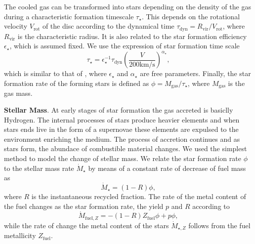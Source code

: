 \documentclass[usenatbib]{mn2e}
\begin{document}
The cooled gas can be  transformed into stars depending on the density of the gas during a characteristic formation timescale $\tau_{\star}$. This depends on the rotational velocity 
$V_{\text{rot}}$ of the disc according to the dynamical time $\tau_{\text{dyn}}=R_{\text{vir}}/V_{\text{rot}}$, where $R_{\text{vir}}$ is the characteristic radius. It is also related to
the star formation efficiency $\epsilon_{\star}$, which is assumed fixed. We use the expression of star formation time scale
\begin{equation}
 \tau_{\star} = \epsilon^{-1}_{\star}\tau_{\text{dyn}}\left( \frac{V}{200\text{km/s}}\right)^{\alpha_\star},
\end{equation}
which is similar to that of \cite{2005MNRAS.356.1191B}, where  $\epsilon_{\star}$ and $\alpha_\star$ are free parameters. Finally, the star formation rate of the forming stars is defined as
$\phi=M_{\text{gas}}/\tau_{\star}$, where $M_{\text{gas}}$ is the gas mass.

\textbf{Stellar Mass}. At early stages of star formation the gas accreted  is basiclly Hydrogen. The internal processes of stars produce heavier elements and when stars 
ends live in the form of a supernovae these elements are expulsed to the environment enriching the medium. The process of accretion continues and as stars form, the abundace of combustible 
material changes. We used the simplest method to model the change of stellar mass. We relate the star formation rate $\phi$  to the stellar mass 
rate $\dot{M}_{\star}$ by  means of a constant rate of decrease of fuel mass as
\begin{equation}
 \dot{M}_{\star}=(1-R)\phi,
\end{equation}
where $R$ is the instantaneous recycled fraction. The rate of the metal content of the fuel changes as the star formation rate, the yield $p$ and $R$  according to
\begin{equation}  
 \dot{M}_{\text{fuel},Z}=-(1-R)Z_{\text{fuel}}\phi+p\phi,
\end{equation}
while the rate of change the metal content of the stars $\dot{M}_{\star, Z}$ follows from the fuel metallicity $Z_{\text{fuel}}$.
\end{document}
